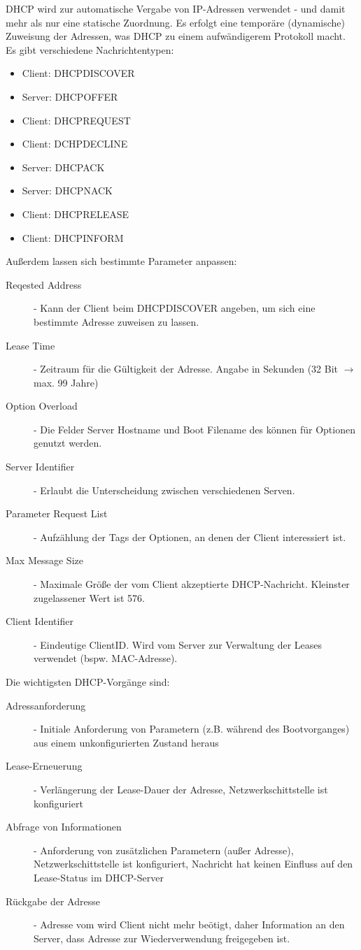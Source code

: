 \documentclass{article} %
\begin{document}
	DHCP wird zur automatische Vergabe von IP-Adressen verwendet - und damit mehr als nur eine statische Zuordnung. Es erfolgt eine temporäre (dynamische) Zuweisung der Adressen, was DHCP zu einem aufwändigerem Protokoll macht. \\
	Es gibt verschiedene Nachrichtentypen:
		\begin{itemize}
		\item Client: DHCPDISCOVER	
		\item Server: DHCPOFFER		
		\item Client: DHCPREQUEST	
		\item Client: DCHPDECLINE	
		\item Server: DHCPACK		
		\item Server: DHCPNACK		
		\item Client: DHCPRELEASE
		\item Client: DHCPINFORM
		\end{itemize}
	Außerdem lassen sich bestimmte Parameter anpassen:
		\begin{description}
		\item[Reqested Address] - Kann der Client beim DHCPDISCOVER angeben, um sich eine bestimmte Adresse zuweisen zu lassen. 
		\item[Lease Time] - Zeitraum für die Gültigkeit der Adresse. Angabe in Sekunden (32 Bit $\rightarrow$ max. 99 Jahre)
		\item[Option Overload] - Die Felder Server Hostname und Boot Filename des können für Optionen genutzt werden.
		\item[Server Identifier] - Erlaubt die Unterscheidung zwischen verschiedenen Serven.
		\item[Parameter Request List] - Aufzählung der Tags der Optionen, an denen der Client interessiert ist. 
		\item[Max Message Size] - Maximale Größe der vom Client akzeptierte DHCP-Nachricht.  Kleinster zugelassener Wert ist 576. 
		\item[Client Identifier] - Eindeutige ClientID. Wird vom Server zur Verwaltung der Leases verwendet (bspw. MAC-Adresse).
		\end{description}
	Die wichtigsten DHCP-Vorgänge sind:
		\begin{description}
		\item[Adressanforderung] - Initiale Anforderung von Parametern (z.B. während des Bootvorganges) aus einem unkonfigurierten Zustand heraus 
		\item[Lease-Erneuerung] - Verlängerung der Lease-Dauer der Adresse, Netzwerkschittstelle ist konfiguriert 		
		\item[Abfrage von Informationen] - Anforderung von zusätzlichen Parametern (außer Adresse), Netzwerkschittstelle ist konfiguriert, Nachricht hat keinen Einfluss auf den Lease-Status im DHCP-Server
		\item[Rückgabe der Adresse ] - Adresse vom wird Client nicht mehr beötigt, daher Information an den Server, dass Adresse zur Wiederverwendung freigegeben ist. 
		\end{description}
		
\end{document}
